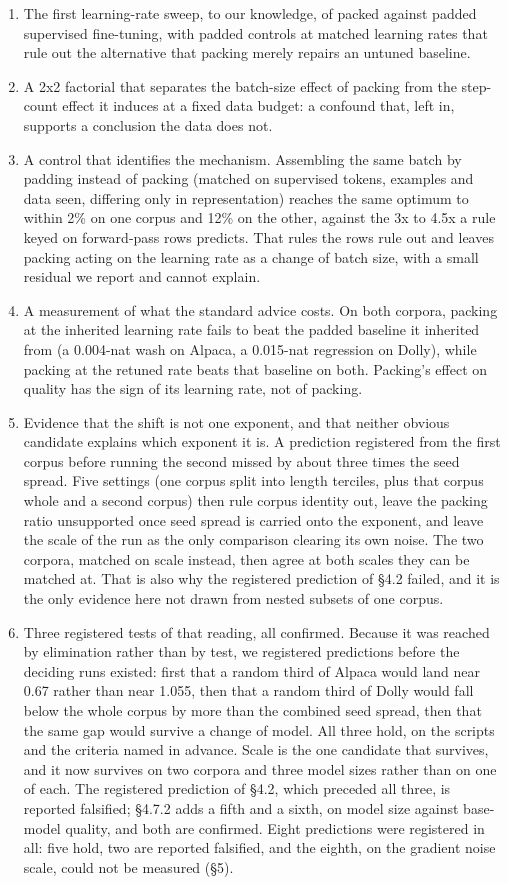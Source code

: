 \documentclass[11pt]{article}
\begin{document}
\begin{enumerate}
\item The first learning-rate sweep, to our knowledge, of packed against padded supervised fine-tuning, with padded controls at matched learning rates that rule out the alternative that packing merely repairs an untuned baseline.
\item A 2x2 factorial that separates the batch-size effect of packing from the step-count effect it induces at a fixed data budget: a confound that, left in, supports a conclusion the data does not.
\item A control that identifies the mechanism. Assembling the same batch by padding instead of packing (matched on supervised tokens, examples and data seen, differing only in representation) reaches the same optimum to within 2\% on one corpus and 12\% on the other, against the 3x to 4.5x a rule keyed on forward-pass rows predicts. That rules the rows rule out and leaves packing acting on the learning rate as a change of batch size, with a small residual we report and cannot explain.
\item A measurement of what the standard advice costs. On both corpora, packing at the inherited learning rate fails to beat the padded baseline it inherited from (a 0.004-nat wash on Alpaca, a 0.015-nat regression on Dolly), while packing at the retuned rate beats that baseline on both. Packing's effect on quality has the sign of its learning rate, not of packing.
\item Evidence that the shift is not one exponent, and that neither obvious candidate explains which exponent it is. A prediction registered from the first corpus before running the second missed by about three times the seed spread. Five settings (one corpus split into length terciles, plus that corpus whole and a second corpus) then rule corpus identity out, leave the packing ratio unsupported once seed spread is carried onto the exponent, and leave the scale of the run as the only comparison clearing its own noise. The two corpora, matched on scale instead, then agree at both scales they can be matched at. That is also why the registered prediction of \S{}4.2 failed, and it is the only evidence here not drawn from nested subsets of one corpus.
\item Three registered tests of that reading, all confirmed. Because it was reached by elimination rather than by test, we registered predictions before the deciding runs existed: first that a random third of Alpaca would land near 0.67 rather than near 1.055, then that a random third of Dolly would fall below the whole corpus by more than the combined seed spread, then that the same gap would survive a change of model. All three hold, on the scripts and the criteria named in advance. Scale is the one candidate that survives, and it now survives on two corpora and three model sizes rather than on one of each. The registered prediction of \S{}4.2, which preceded all three, is reported falsified; \S{}4.7.2 adds a fifth and a sixth, on model size against base-model quality, and both are confirmed. Eight predictions were registered in all: five hold, two are reported falsified, and the eighth, on the gradient noise scale, could not be measured (\S{}5).

\end{enumerate}
\end{document}
